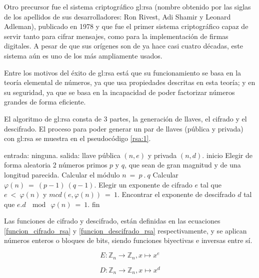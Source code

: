   Otro precursor fue el sistema criptográfico \acrshort{gl:rsa} (nombre 
  obtenido por las siglas de los apellidos de sus desarrolladores: Ron Rivest, 
  Adi Shamir y Leonard Adleman), publicado en 1978 y que fue el primer sistema 
  criptográfico capaz de servir tanto para cifrar mensajes, como para la 
  implementación de firmas digitales. A pesar de que sus orígenes son de ya 
  hace casi cuatro décadas, este sistema aún es uno de los más ampliamente 
  usados.

  Entre los motivos del éxito de \acrshort{gl:rsa} está que su funcionamiento 
  se basa en la teoría elemental de números, ya que usa propiedades descritas 
  en esta teoría; y en su seguridad, ya que se basa en la incapacidad de poder 
  factorizar números grandes de forma eficiente.

  El algoritmo de \acrshort{gl:rsa} consta de 3 partes, la generación de llaves, 
  el cifrado y el descifrado. El proceso para poder generar un par de llaves 
  (pública y privada) con \acrshort{gl:rsa} se muestra en el pseudocódigo 
  \ref{rsa:1}. 

  \begin{pseudocodigo}[caption={Proceso de generación de llaves de 
    \acrshort{gl:rsa}.}, label={rsa:1}]
    entrada: ninguna.
    salida:  llave pública $(n,e)$ y privada $(n,d)$.
    inicio
      Elegir de forma aleatoria 2 números primos $p$ y $q$, que sean de gran 
      magnitud y de una longitud parecida.
      Calcular el módulo $n\: =\: p \:. \:q$
      Calcular $\varphi(n) \:= \:(p-1) \:(q-1)$.
      Elegir un exponente de cifrado $e$ tal que $e \:< \:\varphi(n)$ y $mcd(e,\varphi(n)) \:= \:1$.
      Encontrar el exponente de descifrado $d$ tal que $e . d \:\mod \:\varphi(n) \:= \:1$.
    fin
  \end{pseudocodigo}

  Las funciones de cifrado y descifrado, están definidas en las ecuaciones 
  \ref{funcion_cifrado_rsa} y \ref{funcion_descifrado_rsa} respectivamente, 
  y se aplican números enteros o bloques de bits, siendo funciones biyectivas 
  e inversas entre sí.

  \begin{equation}
    \label{funcion_cifrado_rsa}
    E: \mathbb{Z}_n \longrightarrow \mathbb{Z}_n, x \longmapsto x^e 
  \end{equation}

  \begin{equation}
    \label{funcion_descifrado_rsa}
    D: \mathbb{Z}_n \longrightarrow \mathbb{Z}_n, x \longmapsto x^d 
  \end{equation}

